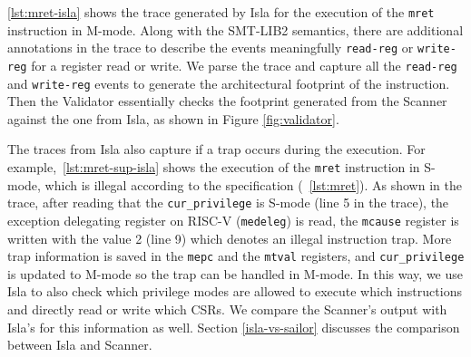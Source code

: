 


\autoref{lst:mret-isla} shows the trace generated by Isla for the execution of the \texttt{mret} instruction in M-mode. 
Along with the SMT-LIB2 semantics, there are additional annotations in the trace to describe the events meaningfully \eg{} \texttt{read-reg} or \texttt{write-reg} for a register read or write. 
We parse the trace and capture all the \texttt{read-reg} and \texttt{write-reg} events to generate the architectural footprint of the instruction. 
Then the Validator essentially checks the footprint generated from the Scanner against the one from Isla, as shown in Figure \ref{fig:validator}. 

The traces from Isla also capture if a trap occurs during the execution. 
For example,~\autoref{lst:mret-sup-isla} shows the execution of the \texttt{mret} instruction in S-mode, which is illegal according to the specification (~\autoref{lst:mret}). 
As shown in the trace, after reading that the \texttt{cur\_privilege} is S-mode (line 5 in the trace), the exception delegating register on RISC-V (\texttt{medeleg}) is read, the \texttt{mcause} register is written with the value 2 (line 9) which denotes an illegal instruction trap. 
More trap information is saved in the \texttt{mepc} and the \texttt{mtval} registers, and \texttt{cur\_privilege} is updated to M-mode so the trap can be handled in M-mode. 
In this way, we use Isla to also check which privilege modes are allowed to execute which instructions and directly read or write which CSRs. 
We compare the Scanner's output with Isla's for this information as well. 
Section \ref{isla-vs-sailor} discusses the comparison between Isla and Scanner. 





